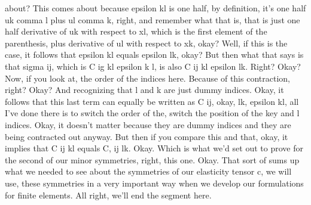 \documentclass[10pt]{article}
\begin{document}
about? This comes about because epsilon kl is one half, by definition, it's one half uk comma l plus ul comma k, right, and remember what that is, that is just one half derivative of uk with respect to xl, which is the first element of the parenthesis, plus derivative of ul with respect to xk, okay? Well, if this is the case, it follows that epsilon kl equals epsilon lk, okay? But then what that says is that sigma ij, which is C ig kl epsilon k l, is also C ij kl epsilon lk. Right? Okay? Now, if you look at, the order of the indices here. Because of this contraction, right? Okay? And recognizing that l and k are just dummy indices. Okay, it follows that this last term can equally be written as C ij, okay, lk, epsilon kl, all I've done there is to switch the order of the, switch the position of the key and l indices. Okay, it doesn't matter because they are dummy indices and they are being contracted out anyway. But then if you compare this and that, okay, it implies that C ij kl equals C, ij lk. Okay. Which is what we'd set out to prove for the second of our minor symmetries, right, this one. Okay. That sort of sums up what we needed to see about the symmetries of our elasticity tensor c, we will use, these symmetries in a very important way when we develop our formulations for finite elements. All right, we'll end the segment here.
\end{document}
